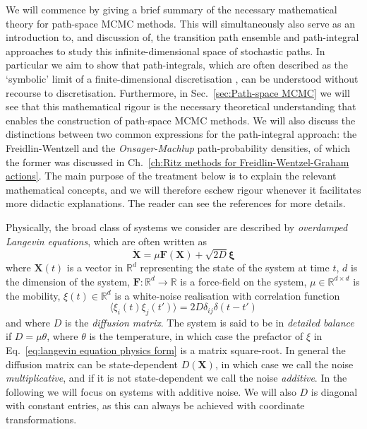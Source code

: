 We will commence by giving a brief summary of the necessary mathematical theory for path-space MCMC methods. This will simultaneously also serve as an introduction to, and discussion of, the transition path ensemble and path-integral approaches to study this infinite-dimensional space of stochastic paths. In particular we aim to show that path-integrals, which are often described as the `symbolic' limit of a finite-dimensional discretisation \citep{mossNoiseNonlinearDynamical1989, stratonovichMarkovMethodsTheory1989}, can be understood without recourse to discretisation. Furthermore, in Sec.~\ref{sec:Path-space MCMC} we will see that this mathematical rigour is the necessary theoretical understanding that enables the construction of path-space MCMC methods. We will also discuss the distinctions between two common expressions for the path-integral approach: the Freidlin-Wentzell and the \textit{Onsager-Machlup} path-probability densities, of which the former was discussed in Ch.~\ref{ch:Ritz methods for Freidlin-Wentzel-Graham actions}. The main purpose of the treatment below is to explain the relevant mathematical concepts, and we will therefore eschew rigour whenever it facilitates more didactic explanations. The reader can see the references for more details.

Physically, the broad class of systems we consider are described by \textit{overdamped Langevin equations}, which are often written as \citep{kampenStochasticProcessesPhysics1992, riskenFokkerPlanckEquationMethods2012a}
\begin{equation} \label{eq:langevin equation physics form}
\dot{\mathbf{X}} = \mu \mathbf{F}(\mathbf{X}) + \sqrt{2D} \boldsymbol{\xi}
\end{equation}
where $\mathbf{X}(t)$ is a vector in $\mathbb{R}^d$ representing the state of the system at time $t$, $d$ is the dimension of the system, $\mathbf{F} : \mathbb{R}^d \to \mathbb{R}$ is a force-field on the system, $\mu \in \mathbb{R}^{d \times d}$ is the mobility, $\xi(t) \in \mathbb{R}^d$  is a white-noise realisation with correlation function
\begin{equation}
\langle \xi_i(t) \xi_j(t') \rangle = 2 D \delta_{ij} \delta(t - t')
\end{equation}
and where $D$ is the \textit{diffusion matrix}. The system is said to be in \textit{detailed balance} if $D = \mu \theta$, where $\theta$ is the temperature, in which case the prefactor of $\xi$ in Eq.~\ref{eq:langevin equation physics form} is a matrix square-root. In general the diffusion matrix can be state-dependent $D(\mathbf{X})$, in which case we call the noise \textit{multiplicative}, and if it is not state-dependent we call the noise \textit{additive}. In the following we will focus on systems with additive noise. We will also $D$ is diagonal with constant entries, as this can always be achieved with coordinate transformations.

